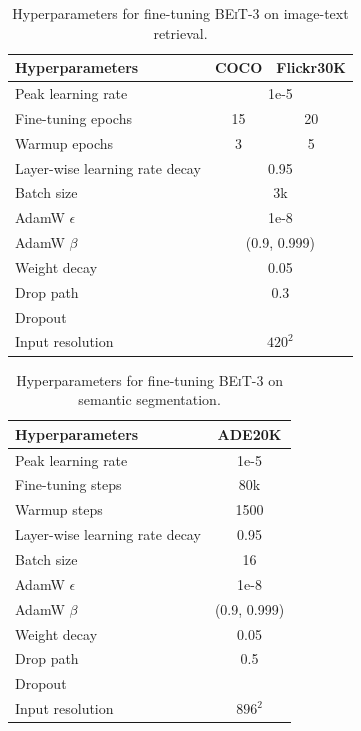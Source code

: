 \documentclass{article}
\newcommand{\xmark}{{\color{black}\ding{55}}}%
\newcommand\our{\textsc{BEiT-3}}
\begin{document}
\begin{table}[H]
\centering
\small
\begin{tabular}{l|cc}
\toprule
\bf Hyperparameters & \bf COCO & \bf Flickr30K \\
\midrule
Peak learning rate & \multicolumn{2}{c}{1e-5} \\
Fine-tuning epochs & 15 & 20 \\
Warmup epochs & 3 & 5 \\
Layer-wise learning rate decay & \multicolumn{2}{c}{0.95} \\
Batch size & \multicolumn{2}{c}{$3$k} \\
AdamW $\epsilon$ & \multicolumn{2}{c}{1e-8}  \\
AdamW $\beta$ & \multicolumn{2}{c}{(0.9, 0.999)} \\
Weight decay & \multicolumn{2}{c}{0.05} \\
Drop path & \multicolumn{2}{c}{0.3} \\
Dropout & \multicolumn{2}{c}{\xmark} \\
Input resolution & \multicolumn{2}{c}{$420^2$} \\
\bottomrule
\end{tabular}
\vspace{2mm}
\caption{
Hyperparameters for fine-tuning \our{} on image-text retrieval.
}
\label{tbl:ft:retrieval:hyperparams}
\end{table}


\begin{table}[H]
\centering
\small
\begin{tabular}{l|c}
\toprule
\bf Hyperparameters & \bf ADE20K \\
\midrule
Peak learning rate & 1e-5 \\
Fine-tuning steps & 80k \\
Warmup steps & 1500 \\
Layer-wise learning rate decay & 0.95 \\
Batch size & 16 \\
AdamW $\epsilon$ & 1e-8  \\
AdamW $\beta$ & (0.9, 0.999) \\
Weight decay & 0.05 \\
Drop path & 0.5 \\
Dropout & \xmark \\
Input resolution & $896^2$ \\
\bottomrule
\end{tabular}
\vspace{2mm}
\caption{
Hyperparameters for fine-tuning \our{} on semantic segmentation.
}
\label{tbl:ft:semseg:hyperparams}
\end{table}
\end{document}
